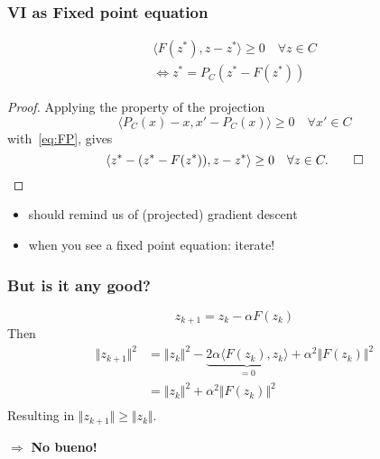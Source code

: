 \documentclass{beamer}
\begin{document}
\begin{frame}
  \frametitle{VI as Fixed point equation}
  \begin{block}{}
    \vspace{-0.5cm}
  \begin{align}
    \langle F(z^*), z-z^* \rangle \ge 0 \quad \forall z \in C \\
    \Leftrightarrow z^* = P_C (z^* - F(z^*)) \label{eq:FP}\tag{FP}
  \end{align}
  \end{block}
  \begin{proof}
    Applying the property of the projection
    \begin{equation}
      \langle P_C(x)-x, x' - P_C(x) \rangle \ge 0 \quad \forall x' \in C
    \end{equation}
    with~\eqref{eq:FP}, gives
    \begin{equation}
    \langle z^* - (z^* - F(z^*)), z-z^* \rangle \ge 0 \quad \forall z \in C.\hfill \qedhere\qed
    \end{equation}
  \end{proof}
  \begin{itemize}
    \item should remind us of (projected) gradient descent
          \item when you see a fixed point equation: iterate!
  \end{itemize}
\end{frame}


\begin{frame}
  \frametitle{But is it any good?}
  \begin{equation}
    z_{k+1} = z_k - \alpha F(z_k)
  \end{equation}
  Then
  \begin{equation}
    \begin{aligned}
      \Vert z_{k+1} \Vert^2 &= \Vert z_k \Vert^2 - \underbrace{2 \alpha \langle F(z_k), z_k \rangle}_{=0} + \alpha^2 \Vert F(z_k) \Vert^2 \\
      &=\Vert z_k \Vert^2 + \alpha^2 \Vert F(z_k) \Vert^2 \\
    \end{aligned}
  \end{equation}
  Resulting in $\Vert z_{k+1} \Vert \ge \Vert z_k \Vert$.
  \begin{center}
    $\Rightarrow$ \textbf{No bueno!}
  \end{center}
\end{frame}
\end{document}
